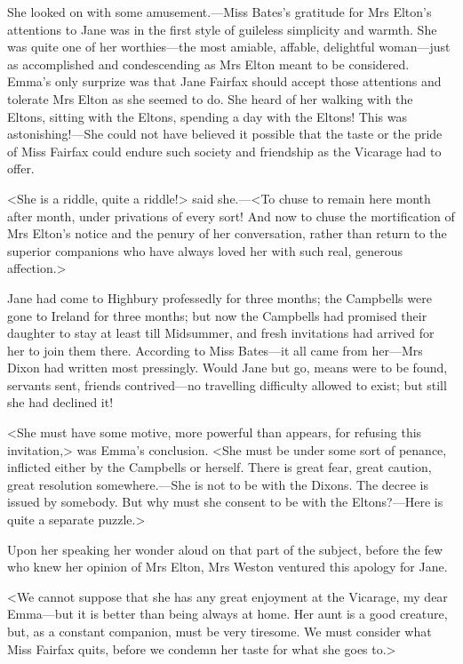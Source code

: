 She looked on with some amusement.—Miss Bates's gratitude for Mrs Elton's attentions to Jane was in the first style of guileless simplicity and warmth. She was quite one of her worthies—the most amiable, affable, delightful woman—just as accomplished and condescending as Mrs Elton meant to be considered. Emma's only surprize was that Jane Fairfax should accept those attentions and tolerate Mrs Elton as she seemed to do. She heard of her walking with the Eltons, sitting with the Eltons, spending a day with the Eltons! This was astonishing!—She could not have believed it possible that the taste or the pride of Miss Fairfax could endure such society and friendship as the Vicarage had to offer.

<She is a riddle, quite a riddle!> said she.—<To chuse to remain here month after month, under privations of every sort! And now to chuse the mortification of Mrs Elton's notice and the penury of her conversation, rather than return to the superior companions who have always loved her with such real, generous affection.>

Jane had come to Highbury professedly for three months; the Campbells were gone to Ireland for three months; but now the Campbells had promised their daughter to stay at least till Midsummer, and fresh invitations had arrived for her to join them there. According to Miss Bates—it all came from her—Mrs Dixon had written most pressingly. Would Jane but go, means were to be found, servants sent, friends contrived—no travelling difficulty allowed to exist; but still she had declined it!

<She must have some motive, more powerful than appears, for refusing this invitation,> was Emma's conclusion. <She must be under some sort of penance, inflicted either by the Campbells or herself. There is great fear, great caution, great resolution somewhere.—She is not to be with the Dixons. The decree is issued by somebody. But why must she consent to be with the Eltons?—Here is quite a separate puzzle.>

Upon her speaking her wonder aloud on that part of the subject, before the few who knew her opinion of Mrs Elton, Mrs Weston ventured this apology for Jane.

<We cannot suppose that she has any great enjoyment at the Vicarage, my dear Emma—but it is better than being always at home. Her aunt is a good creature, but, as a constant companion, must be very tiresome. We must consider what Miss Fairfax quits, before we condemn her taste for what she goes to.>

